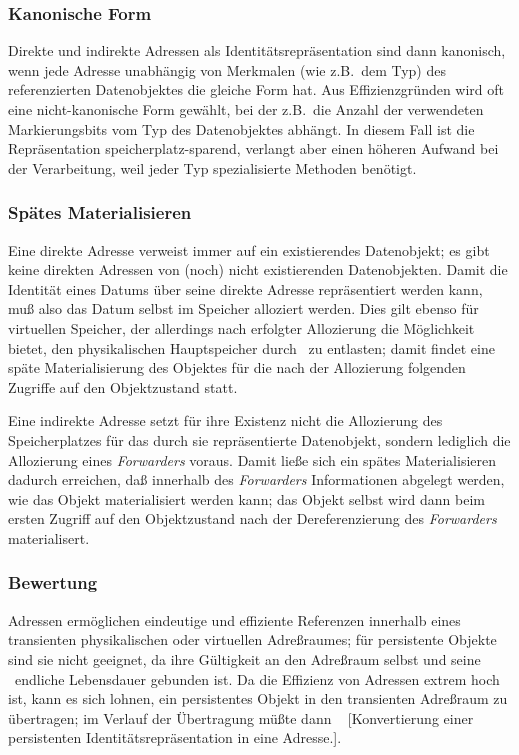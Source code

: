 \subsubsection{Kanonische Form}
%
Direkte und indirekte Adressen als Identit\"{a}tsrepr\"{a}sentation sind
dann kanonisch, wenn jede Adresse unabh\"{a}ngig von Merkmalen (wie
z.B.\ dem Typ) des referenzierten Datenobjektes die gleiche Form hat.
Aus Effizienzgr\"{u}nden wird oft eine nicht-kanonische Form gew\"{a}hlt,
bei der z.B.\ die Anzahl der verwendeten Markierungsbits vom Typ des
Datenobjektes abh\"{a}ngt. In diesem Fall ist die Repr\"{a}sentation
speicherplatz-sparend, verlangt aber einen h\"{o}heren Aufwand bei der
Verarbeitung, weil jeder Typ spezialisierte Methoden ben\"{o}tigt.
%
\subsubsection{Sp\"{a}tes Materialisieren}
%
Eine direkte Adresse verweist immer auf ein existierendes Datenobjekt;
es gibt keine direkten Adressen von (noch) nicht existierenden
Datenobjekten. Damit die Identit\"{a}t eines Datums \"{u}ber seine direkte
Adresse repr\"{a}sentiert werden kann, mu\ss{} also das Datum selbst im
Speicher alloziert werden.  Dies gilt ebenso f\"{u}r virtuellen Speicher,
der allerdings nach erfolgter Allozierung die M\"{o}glichkeit bietet, den
physikalischen Hauptspeicher durch
\ zu
entlasten; damit findet eine sp\"{a}te Materialisierung des Objektes
f\"{u}r die nach der Allozierung folgenden Zugriffe auf den Objektzustand
statt.
%
\par{}Eine indirekte Adresse setzt f\"{u}r ihre Existenz nicht die
Allozierung des Speicherplatzes f\"{u}r das durch sie repr\"{a}sentierte
Datenobjekt, sondern lediglich die Allozierung eines {\em
Forwarders\/} voraus. Damit lie\ss{}e sich ein
sp\"{a}tes Materialisieren dadurch erreichen, da\ss{} innerhalb des
{\em Forwarders\/} Informationen abgelegt werden, wie das Objekt
materialisiert werden kann; das Objekt selbst wird dann beim ersten
Zugriff auf den Objektzustand nach der Dereferenzierung des
{\em Forwarders\/} materialisert.
%
\subsubsection{Bewertung}
%
Adressen erm\"{o}glichen eindeutige und effiziente Referenzen innerhalb
eines transienten physikalischen oder virtuellen Adre\ss{}raumes; f\"{u}r
persistente Objekte sind sie nicht geeignet, da ihre G\"{u}ltigkeit an
den Adre\ss{}raum selbst und seine \ia\ endliche Lebensdauer gebunden
ist. Da die Effizienz von Adressen extrem hoch ist, kann es sich
lohnen, ein persistentes Objekt in den transienten Adre\ss{}raum zu
\"{u}bertragen; im Verlauf der \"{U}bertragung m\"{u}\ss{}te dann \ua\ %
[Konvertierung
einer persistenten Identit\"{a}tsrepr\"{a}sentation in eine Adresse.].
%
